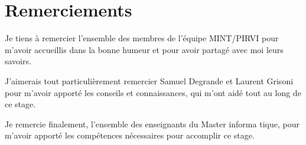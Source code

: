 \chapter*{Remerciements}

Je tiens à remercier l’ensemble des membres de l'équipe MINT/PIRVI pour m’avoir accueillis dans la bonne humeur et pour avoir partagé avec moi leurs savoirs.

J’aimerais tout particulièrement remercier Samuel Degrande et Laurent Grisoni pour m’avoir apporté les conseils et connaissances, qui m’ont aidé tout au long de ce stage.

Je remercie finalement, l’ensemble des enseignants du Master informa
tique, pour m’avoir apporté les compétences nécessaires pour accomplir ce stage.
\newpage
